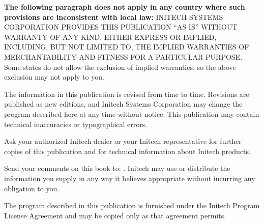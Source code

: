\begin{TitleVerso}
\IsThisGoodForTheCompany\par
{\imLegalFont
\textbf{The following paragraph does not apply in any country where such
provisions are inconsistent with local law:} INITECH SYSTEMS CORPORATION
PROVIDES THIS PUBLICATION ``AS IS'' WITHOUT WARRANTY OF ANY KIND, EITHER
EXPRESS OR IMPLIED, INCLUDING, BUT NOT LIMITED TO, THE IMPLIED WARRANTIES OF
MERCHANTABILITY AND FITNESS FOR A PARTICULAR PURPOSE.  Some states do not
allow the exclusion of implied warranties, so the above exclusion may not
apply to you.\par
The information in this publication is revised from time to time.
Revisions are published as new editions, and Initech Systems Corporation
may change the program described here at any time without notice.  This
publication may contain technical inaccuracies or typographical errors.\par
Ask your authorized Initech dealer or your Initech representative for
further copies of this publication and for technical information about
Initech products.\par}

{\footnotesize
Send your comments on this book to: \InitechAddressLine.
Initech may use or distribute the information you supply in any way it
believes appropriate without incurring any obligation to you.\par
The program described in this publication is furnished under the Initech
Program License Agreement and may be copied only as that agreement
permits.\par}
\end{TitleVerso}
